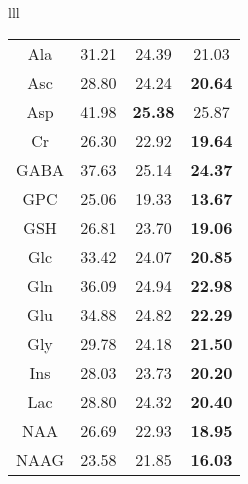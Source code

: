 \documentclass{llncs}
\begin{document}
\begin{table*}
\begin{center}
\begin{tabular}{lll}
\begin{tabular}{c c c c}
Ala	 & 31.21  	& 24.39 	&     21.03 	\\
Asc      & 28.80  	& 24.24 	& \bf 20.64 	\\
Asp      & 41.98  	& \bf 25.38 	&     25.87 	\\
Cr       & 26.30  	& 22.92 	& \bf 19.64 	\\
GABA     & 37.63  	& 25.14 	& \bf 24.37 	\\
GPC      & 25.06  	& 19.33 	& \bf 13.67 	\\
GSH      & 26.81  	& 23.70 	& \bf 19.06 	\\
Glc      & 33.42  	& 24.07 	& \bf 20.85 	\\
Gln      & 36.09  	& 24.94 	& \bf 22.98 	\\
Glu      & 34.88  	& 24.82 	& \bf 22.29 	\\
Gly      & 29.78  	& 24.18 	& \bf 21.50 	\\
Ins      & 28.03  	& 23.73 	& \bf 20.20 	\\
Lac      & 28.80  	& 24.32 	& \bf 20.40 	\\
NAA      & 26.69  	& 22.93 	& \bf 18.95 	\\
NAAG     & 23.58  	& 21.85 	& \bf 16.03 	\\

\end{tabular}
\end{tabular}
\end{center}
\end{table*}
\end{document}
